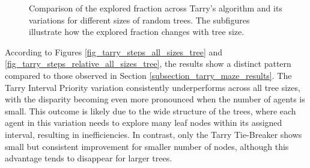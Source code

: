 \begin{figure}[H]
    \centering
    \qquad
    \qquad
    \newline 
    \qquad
    \newline 
    \caption{Comparison of the explored fraction across Tarry's algorithm and its variations for different sizes of random trees. The subfigures illustrate how the explored fraction changes with tree size.} 
    \label{fig_tarry_fraction_all_sizes_tree} 
\end{figure}

According to Figures \ref{fig_tarry_steps_all_sizes_tree} and \ref{fig_tarry_steps_relative_all_sizes_tree}, the results show a distinct pattern compared to those observed in Section \ref{subsection_tarry_maze_results}. The Tarry Interval Priority variation consistently underperforms across all tree sizes, with the disparity becoming even more pronounced when the number of agents is small. This outcome is likely due to the wide structure of the trees, where each agent in this variation needs to explore many leaf nodes within its assigned interval, resulting in inefficiencies. In contrast, only the Tarry Tie-Breaker shows small but consistent improvement for smaller number of nodes, although this advantage tends to disappear for larger trees.


